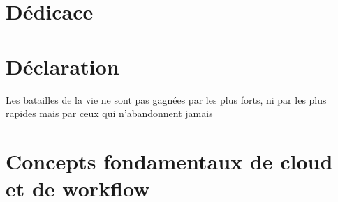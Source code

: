 \documentclass[12pt,twoside]{report}
\author{Zerrouki Djamel}
\theoremstyle{plain}
\theoremstyle{definition}
\theoremstyle{Remarque}
\begin{document}
 
 
 
 
 
 



\clearpage

\printglossary[title=Special Terms, toctitle=List of terms]
 
 
 



 
 
 


  
  
 
 \chapter*{Dédicace}
 

\chapter*{Déclaration}
 Les batailles de la vie ne sont pas gagnées par les plus forts, ni par les plus rapides mais par ceux qui n'abandonnent jamais





 



\tableofcontents

\listoffigures

\listoftables



 
\chapter{Concepts fondamentaux de cloud et de workflow }

\end{document}
